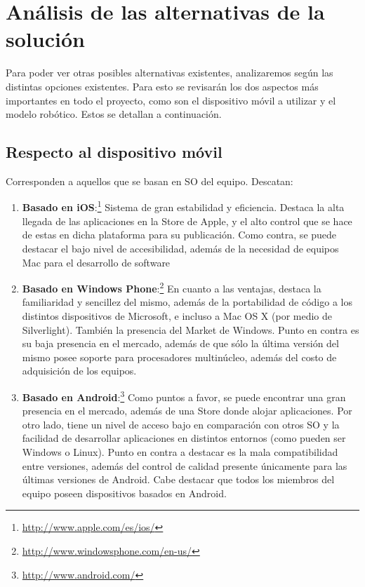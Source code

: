 \newpage
\section{An\'alisis de las alternativas de la soluci\'on}

Para poder ver otras posibles alternativas existentes, analizaremos seg\'un las distintas opciones existentes. Para esto se revisar\'an los dos aspectos m\'as importantes en todo el proyecto, como son el dispositivo m\'ovil a utilizar y el modelo rob\'otico. Estos se detallan a continuaci\'on.
\subsection{Respecto al dispositivo m\'ovil}
Corresponden a aquellos que se basan en SO del equipo. Descatan:
  \begin{enumerate}
  \item {\bf Basado en iOS}:\footnote{\url{http://www.apple.com/es/ios/}} Sistema de gran estabilidad y eficiencia. Destaca la alta llegada de las aplicaciones en la Store de Apple, y el alto control que se hace de estas en dicha plataforma para su publicaci\'on. Como contra, se puede destacar el bajo nivel de accesibilidad, adem\'as de la necesidad de equipos Mac para el desarrollo de software
  \item {\bf Basado en Windows Phone}:\footnote{\url{http://www.windowsphone.com/en-us/}} En cuanto a las ventajas, destaca la familiaridad y sencillez del mismo, adem\'as de la portabilidad de c\'odigo a los distintos dispositivos de Microsoft, e incluso a Mac OS X (por medio de Silverlight). Tambi\'en la presencia del Market de Windows. Punto en contra es su baja presencia en el mercado, adem\'as de que s\'olo la \'ultima versi\'on del mismo posee soporte para procesadores multin\'ucleo, adem\'as del costo de adquisici\'on de los equipos.
  \item {\bf Basado en Android}:\footnote{\url{http://www.android.com/}} Como puntos a favor, se puede encontrar una gran presencia en el mercado, adem\'as de una Store donde alojar aplicaciones. Por otro lado, tiene un nivel de acceso bajo en comparaci\'on con otros SO y la facilidad de desarrollar aplicaciones en distintos entornos (como pueden ser Windows o Linux). Punto en contra a destacar es la mala compatibilidad entre versiones, adem\'as del control de calidad presente \'unicamente para las \'ultimas versiones de Android. Cabe destacar que todos los miembros del equipo poseen dispositivos basados en Android.
  \end{enumerate}
